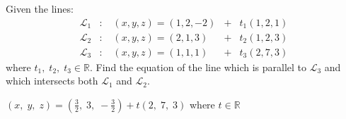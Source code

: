 
\begin{Exercise}[
name={},
title={}, 
difficulty=0,
origin={\cite{BS}}]
Given the lines:
\[
\begin{array}{lllllllll}
\mathcal{L}_1 & : & \; (x, y, z)=(1, 2, -2) & + & t_1(1, 2, 1)\\
\mathcal{L}_2 & : & \; (x, y, z)=(2, 1, 3) & + & t_2(1, 2, 3)\\
\mathcal{L}_3 & : & \; (x, y, z)=(1, 1, 1) & + & t_3(2, 7, 3)
\end{array}
\]
where $t_1,\;t_2,\;t_3\in\mathbb{R}$.  Find the equation of the line
which is parallel to $\mathcal{L}_3$ and which intersects both
$\mathcal{L}_1$ and $\mathcal{L}_2$.
\end{Exercise}
\begin{Answer}
$(x,\;y,\;z)=(\frac32,\;3,\;-\frac32)+t(2,\;7,\;3)$ where $t\in\mathbb{R}$
\end{Answer}
